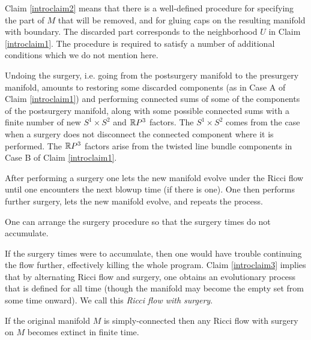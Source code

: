 Claim \ref{introclaim2} means that there is a well-defined
procedure for  specifying the part of $M$ that will be removed, and
for gluing caps on the resulting manifold with boundary.
The discarded part corresponds to the neighborhood $U$ in Claim \ref{introclaim1}.
The procedure is required to satisfy a number
of additional conditions which we do not mention here.

Undoing the surgery, i.e. going from the postsurgery manifold to the
presurgery manifold, amounts to restoring some discarded
components (as in Case A of Claim \ref{introclaim1})
and performing connected sums of some
of the components of the postsurgery manifold, along with some
possible connected sums with a finite number of new $S^1 \times S^2$ and
${\mathbb R} P^3$ factors.  The $S^1 \times S^2$ comes from the case when a
surgery does not disconnect the connected component where it is
performed.  The ${\mathbb R} P^3$ factors arise from the twisted line bundle
components in Case B of Claim \ref{introclaim1}.

After performing a surgery one lets the new manifold evolve under
the Ricci flow until one encounters the next blowup time (if
there is one).  One then performs further surgery, lets the new manifold
evolve, and repeats the process.

\begin{proposition}
  \label{prop:kl-overview-ricci-flow-approach-manifold-geometrization-ricci-flow-surgery-proposition}
 \cite{Perelman2} \label{introclaim3}
One can arrange the surgery procedure so that the surgery times
do not accumulate.
\end{proposition}

If the surgery times were to accumulate, then one would have trouble continuing
the flow further, effectively killing the whole program.
Claim \ref{introclaim3} implies that by alternating Ricci flow and surgery,
one  obtains an evolutionary process that is defined for all time
(though the manifold may become the empty set from some time
onward).  We call this   {\em Ricci flow with surgery}.


\begin{proposition}
  \label{prop:kl-overview-ricci-flow-approach-manifold-geometrization-ricci-flow-surgery-proposition-4}
 \cite{Colding-Minicozzi,Colding-Minicozzi2,Perelman3}
\label{introclaim4}
If the original manifold $M$ is simply-connected then any Ricci flow with
surgery on $M$ becomes extinct in finite time.
\end{proposition}

